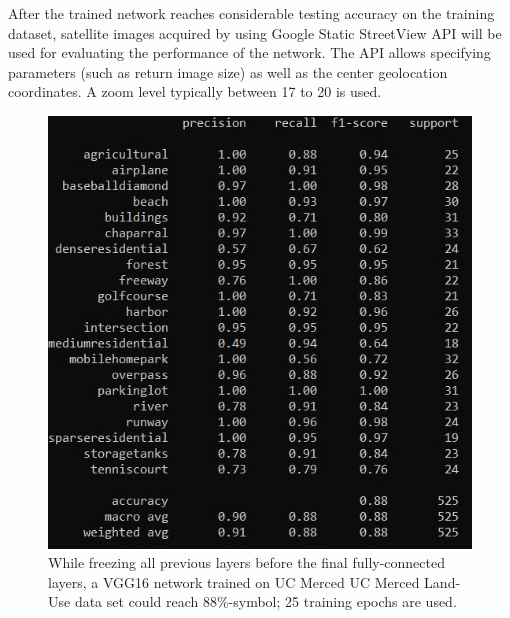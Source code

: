 \documentclass[10pt,twocolumn,letterpaper]{article}
\begin{document}
After the trained network reaches considerable testing accuracy on the training dataset, satellite images acquired by using Google Static StreetView API will be used for evaluating the performance of the network. The API allows specifying parameters (such as return image size) as well as the center geolocation coordinates. A zoom level typically between 17 to 20 is used.

\begin{figure}[t]
\begin{center}
   \includegraphics[width=1.0\linewidth]{vgg16.jpg}
\end{center}
   \caption{While freezing all previous layers before the final fully-connected layers, a VGG16 network trained on UC Merced  UC Merced Land-Use data set could reach 88\%-symbol; 25 training epochs are used.}
\label{fig:long}
\label{fig:onecol}
\end{figure}
\end{document}
